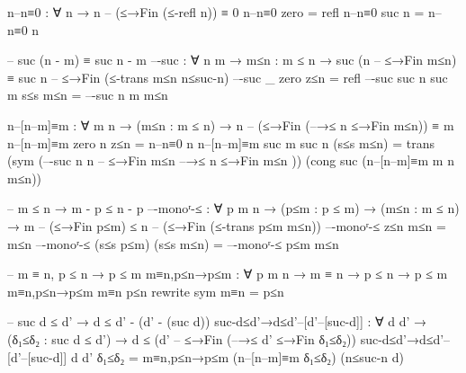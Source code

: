 \documentclass{article}
\begin{document}
\begin{prev}
\begin{code}
n–n≡0 : ∀ {n} → n – (≤→Fin (≤-refl {n})) ≡ 0
n–n≡0 {zero} = refl
n–n≡0 {suc n} = n–n≡0 {n}

-- suc (n - m) ≡ suc n - m
–-suc : ∀ {n m} → {m≤n : m ≤ n} 
          → suc (n – ≤→Fin m≤n) ≡ suc n – ≤→Fin (≤-trans m≤n n≤suc-n)
–-suc {_} {zero} {z≤n} = refl
–-suc {suc n} {suc m} {s≤s m≤n} = –-suc {n} {m} {m≤n}


n–[n–m]≡m : ∀ {m n} → (m≤n : m ≤ n) 
                → n – (≤→Fin (–→≤ {n} {≤→Fin m≤n})) ≡ m
n–[n–m]≡m {zero} {n} z≤n = n–n≡0 {n}
n–[n–m]≡m {suc m} {suc n} (s≤s m≤n) = trans (sym (–-suc {n} {n – ≤→Fin m≤n} { –→≤ {n} {≤→Fin m≤n} })) (cong suc (n–[n–m]≡m {m} {n} m≤n))

-- m ≤ n → m - p ≤ n - p
–-monoʳ-≤ : ∀ {p m n} → (p≤m : p ≤ m) → (m≤n : m ≤ n) → m – (≤→Fin p≤m) ≤ n – (≤→Fin (≤-trans p≤m m≤n))
–-monoʳ-≤ z≤n m≤n = m≤n
–-monoʳ-≤ (s≤s p≤m) (s≤s m≤n) = –-monoʳ-≤ p≤m m≤n

-- m ≡ n, p ≤ n → p ≤ m
m≡n,p≤n→p≤m : ∀ {p m n} → m ≡ n → p ≤ n → p ≤ m
m≡n,p≤n→p≤m m≡n p≤n rewrite sym m≡n = p≤n


-- suc d ≤ d' → d ≤ d' - (d' - (suc d))
suc-d≤d'→d≤d'–[d'–[suc-d]] : ∀ {d d'} → (δ₁≤δ₂ : suc d ≤ d') → d ≤ (d' – ≤→Fin (–→≤ {d'} {≤→Fin δ₁≤δ₂}))
suc-d≤d'→d≤d'–[d'–[suc-d]] {d} {d'} δ₁≤δ₂ = m≡n,p≤n→p≤m (n–[n–m]≡m δ₁≤δ₂) (n≤suc-n {d})
\end{code}
\end{prev}
\end{document}
